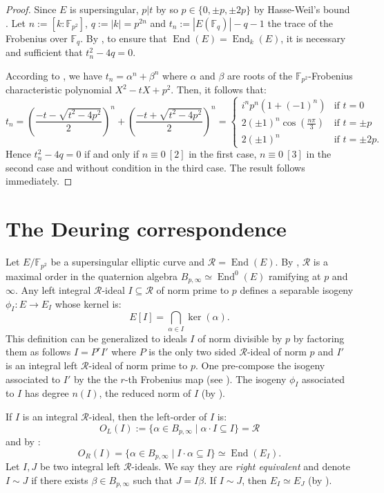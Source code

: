 \documentclass[a4paper,10pt]{report}
\theoremstyle{definition}
\theoremstyle{plain}
\theoremstyle{definition}
\newcommand{\F}{\mathbb{F}}
\newcommand{\m}[1]{\mathcal{#1}}
\renewcommand{\(}{\left(}
\renewcommand{\)}{\right)}
\DeclareMathOperator{\End}{End}
\begin{document}
\begin{proof}
Since $E$ is supersingular,  $p|t$ by \cite[Theorem V.4.1.a]{Silverman1} so $p\in\{0,\pm p, \pm 2p\}$ by Hasse-Weil's bound \cite[Theorem V.1.1]{Silverman1}.  Let $n:=[k:\F_{p^2}]$, $q:=|k|=p^{2n}$ and $t_n:=|E(\F_{q})|-q-1$ the trace of the Frobenius over $\F_q$.  By \cite[Theorem 4.1]{Waterhouse1969},  to ensure that $\End(E)=\End_k(E)$,  it is necessary and sufficient that $t_n^2-4q=0$. 

According to \cite[Theorem V.2.3.1.a]{Silverman1},  we have $t_n=\alpha^n+\beta^n$ where $\alpha$ and $\beta$ are roots of the $\F_{p^2}$-Frobenius characteristic polynomial $X^2-tX+p^2$.  Then,  it follows that:
\[t_n=\(\frac{-t-\sqrt{t^2-4p^2}}{2}\)^n+\(\frac{-t+\sqrt{t^2-4p^2}}{2}\)^n=\left\{
\begin{array}{cl}
i^np^n(1+(-1)^n) & \mbox{if } t=0\\
2(\pm 1)^n\cos\(\frac{n\pi}{3}\)& \mbox{if } t=\pm p\\
2(\pm 1)^n & \mbox{if } t=\pm 2p. 
\end{array}
\right.\]
Hence $t_n^2-4q=0$ if and only if $n\equiv 0 \ [2]$ in the first case,  $n\equiv 0 \ [3]$ in the second case and without condition in the third case.  The result follows immediately.
\end{proof}

\section{The Deuring correspondence}\label{paragraph 2}

Let $E/\F_{p^2}$ be a supersingular elliptic curve and $\m{R}=\End(E)$.  By \cite[Theorem 42.1.9]{Voight}, $\m{R}$ is a maximal order in the quaternion algebra $B_{p,\infty}\simeq\End^0(E)$ ramifying at $p$ and $\infty$. Any left integral $\m{R}$-ideal $I\subseteq \m{R}$ of norm prime to $p$ defines a separable isogeny $\phi_I : E\longrightarrow E_I$ whose kernel is:
\[E[I]=\bigcap_{\alpha\in I}\ker(\alpha).\]
This definition can be generalized to ideals $I$ of norm divisible by $p$ by factoring them as follows $I=P^r I'$ where $P$ is the only two sided $\m{R}$-ideal of norm $p$ and $I'$ is an integral left $\m{R}$-ideal of norm prime to $p$.  One pre-compose the isogeny associated to $I'$ by the the $r$-th Frobenius map (see \cite[42.2.4]{Voight}).  The isogeny $\phi_I$ associated to $I$ has degree $n(I)$, the reduced norm of $I$ (by \cite[Proposition 42.2.16.(a)]{Voight}).

If $I$ is an integral $\m{R}$-ideal, then the left-order of $I$ is: 
\[O_L(I):=\{\alpha\in B_{p,\infty}\mid \alpha\cdot I \subseteq I\}=\m{R}\]
and by \cite[Lemma 42.2.9]{Voight}:
\[O_R(I)=\{\alpha\in B_{p,\infty}\mid I\cdot\alpha \subseteq I\}\simeq \End(E_I).\]
Let $I, J$ be two integral left $\m{R}$-ideals. We say they are \emph{right equivalent} and denote $I\sim J$ if there exists $\beta\in B_{p,\infty}$ such that $J=I\beta$. If $I\sim J$, then $E_I\simeq E_J$ (by \cite[Lemma 42.2.13]{Voight}).
\end{document}

